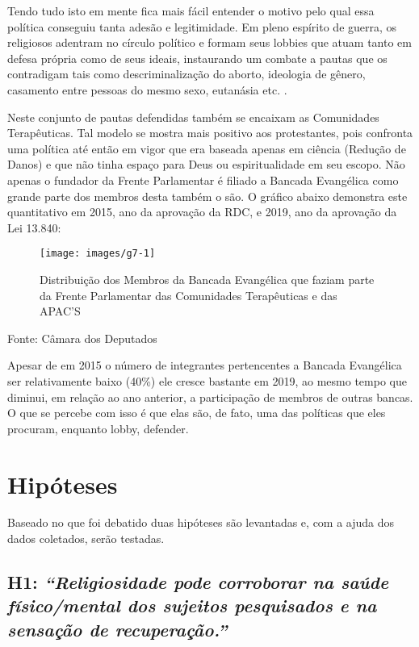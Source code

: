 \documentclass[
	12pt,				%
	oneside,			%
	a4paper,			%
	sumario=tradicional,
	english,			%
	brazil				%
	]{abntex2}
\newcommand{\bcenter}{\begin{center}}
\newcommand{\ecenter}{\end{center}}
\begin{document}
Tendo tudo isto em mente fica mais fácil entender o motivo pelo qual essa política conseguiu tanta adesão e legitimidade. Em pleno espírito de guerra, os religiosos adentram no círculo político e formam seus lobbies que atuam tanto em defesa própria como de seus ideais, instaurando um combate a pautas que os contradigam tais como descriminalização do aborto, ideologia de gênero, casamento entre pessoas do mesmo sexo, eutanásia etc. \autocite{mariano_laicidade_2011-1,natividade_sexualidades_2009}.

Neste conjunto de pautas defendidas também se encaixam as Comunidades Terapêuticas. Tal modelo se mostra mais positivo aos protestantes, pois confronta uma política até então em vigor que era baseada apenas em ciência (Redução de Danos) e que não tinha espaço para Deus ou espiritualidade em seu escopo. Não apenas o fundador da Frente Parlamentar é filiado a Bancada Evangélica como grande parte dos membros desta também o são. O gráfico abaixo demonstra este quantitativo em 2015, ano da aprovação da RDC, e 2019, ano da aprovação da Lei 13.840:
\begin{figure}[H]

{\centering \texttt{[image: images/g7-1]} 

}

\caption{Distribuição dos Membros da Bancada Evangélica que faziam parte da Frente Parlamentar das Comunidades Terapêuticas e das APAC'S}\label{fig:g7}
\end{figure}
\bcenter

Fonte: Câmara dos Deputados
\ecenter

Apesar de em 2015 o número de integrantes pertencentes a Bancada Evangélica ser relativamente baixo (40\%) ele cresce bastante em 2019, ao mesmo tempo que diminui, em relação ao ano anterior, a participação de membros de outras bancas. O que se percebe com isso é que elas são, de fato, uma das políticas que eles procuram, enquanto lobby, defender.

\hypertarget{hipuxf3teses}{%
\chapter{Hipóteses}\label{hipuxf3teses}}

Baseado no que foi debatido duas hipóteses são levantadas e, com a ajuda dos dados coletados, serão testadas.

\hypertarget{h1-religiosidade-pode-corroborar-na-sauxfade-fuxedsicomental-dos-sujeitos-pesquisados-e-na-sensauxe7uxe3o-de-recuperauxe7uxe3o.}{%
\section{\texorpdfstring{\textbf{H1}: \emph{``Religiosidade pode corroborar na saúde físico/mental dos sujeitos pesquisados e na sensação de recuperação.''}}{H1: ``Religiosidade pode corroborar na saúde físico/mental dos sujeitos pesquisados e na sensação de recuperação.''}}\label{h1-religiosidade-pode-corroborar-na-sauxfade-fuxedsicomental-dos-sujeitos-pesquisados-e-na-sensauxe7uxe3o-de-recuperauxe7uxe3o.}}
\end{document}

